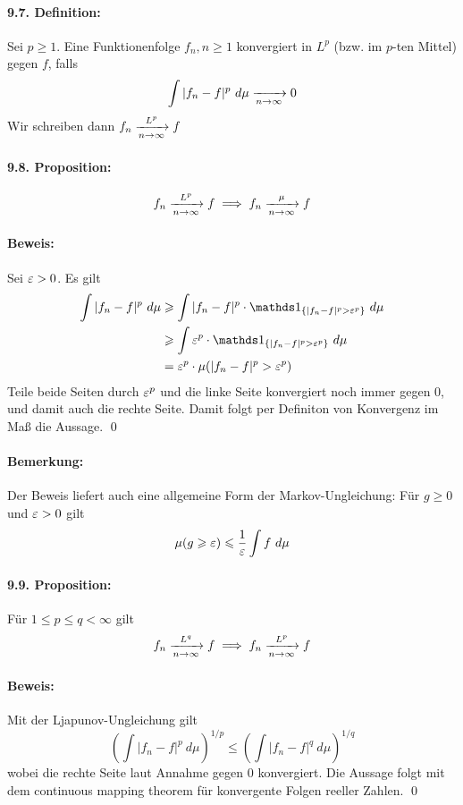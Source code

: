 \paragraph{9.7. Definition:} Sei $p\geq1$. Eine Funktionenfolge $f_n,n\geq1$ konvergiert in $L^p$ (bzw. im $p$-ten Mittel) gegen $f$, falls
$$\int|f_n-f|^p\ d\mu\nto{}{n\to\infty}0$$
Wir schreiben dann $f_n\nto{L^p}{n\to\infty}f$

\paragraph{9.8. Proposition:}
$$f_n\nto{L^p}{n\to\infty}f\implies f_n\nto{\mu}{n\to\infty}f$$

\paragraph{Beweis:}Sei $\varepsilon>0$. Es gilt
\begin{align*}
    \int|f_n-f|^p\ d\mu&\geq \int|f_n-f|^p\cdot\ind{\{|f_n-f|^p>\eps^p\}}\ d\mu\\
    &\geq \int \eps^p\cdot\ind{\{|f_n-f|^p>\eps^p\}}\ d\mu \\
    &=\eps^p\cdot\mu(|f_n-f|^p>\eps^p)
\end{align*}
Teile beide Seiten durch $\varepsilon^p$ und die linke Seite konvergiert noch immer gegen $0$, und damit auch die rechte Seite. Damit folgt per Definiton von Konvergenz im Ma\ss{} die Aussage. \qed

\paragraph{Bemerkung:} Der Beweis liefert auch eine allgemeine Form der Markov-Ungleichung: F\"ur $g\geq0$ und $\varepsilon>0$ gilt
$$\mu(g\geq\eps)\leq\dfrac{1}{\eps}\int f\ d\mu$$

\paragraph{9.9. Proposition:} F\"ur $1\leq p\leq q<\infty$ gilt 
$$f_n\nto{L^q}{n\to\infty}f\implies f_n\nto{L^p}{n\to\infty}f$$
\paragraph{Beweis:}Mit der Ljapunov-Ungleichung gilt
$$\left(\int|f_n-f|^p\ d\mu\right)^{1/p}\leq\left(\int|f_n-f|^q\ d\mu \right)^{1/q}$$
wobei die rechte Seite laut Annahme gegen $0$ konvergiert. Die Aussage folgt mit dem continuous mapping theorem f\"ur konvergente Folgen reeller Zahlen. \qed

